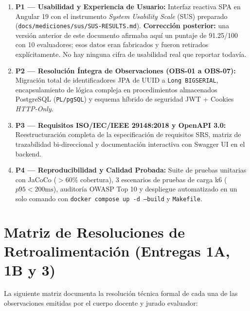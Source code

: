 \documentclass[10pt,a4paper]{article}
\begin{document}
\begin{tcolorbox}[colframe=boxred,colback=boxredbg,arc=1mm,boxrule=1pt,title={\bfseries 1. Criterios de Excelencia del Avance 3 (Puntos Clave del Proyecto)}]
\begin{enumerate}
    \item \textbf{P1 --- Usabilidad y Experiencia de Usuario:} Interfaz reactiva SPA en Angular 19 con el instrumento \textit{System Usability Scale} (SUS) preparado (\texttt{docs/mediciones/sus/SUS-RESULTS.md}). \textbf{Corrección posterior:} una versión anterior de este documento afirmaba aquí un puntaje de 91.25/100 con 10 evaluadores; esos datos eran fabricados y fueron retirados explícitamente. No hay ninguna cifra de usabilidad real que reportar todavía.
    \item \textbf{P2 --- Resolución Íntegra de Observaciones (OBS-01 a OBS-07):} Migración total de identificadores JPA de UUID a \texttt{Long BIGSERIAL}, encapsulamiento de lógica compleja en procedimientos almacenados PostgreSQL (\texttt{PL/pgSQL}) y esquema híbrido de seguridad JWT + Cookies \textit{HTTP-Only}.
    \item \textbf{P3 --- Requisitos ISO/IEC/IEEE 29148:2018 y OpenAPI 3.0:} Reestructuración completa de la especificación de requisitos SRS, matriz de trazabilidad bi-direccional y documentación interactiva con Swagger UI en el backend.
    \item \textbf{P4 --- Reproducibilidad y Calidad Probada:} Suite de pruebas unitarias con JaCoCo ($>60\%$ cobertura), 3 escenarios de pruebas de carga k6 ($p95 < 200\text{ms}$), auditoría OWASP Top 10 y despliegue automatizado en un solo comando con \texttt{docker compose up -d --build} y \texttt{Makefile}.
\end{enumerate}
\end{tcolorbox}

\vspace{0.4cm}

\section{Matriz de Resoluciones de Retroalimentación (Entregas 1A, 1B y 3)}

La siguiente matriz documenta la resolución técnica formal de cada una de las observaciones emitidas por el cuerpo docente y jurado evaluador:
\end{document}
